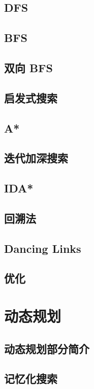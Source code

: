 \section{DFS}

\section{BFS}

\section{双向 BFS}

\section{启发式搜索}

\section{A*}

\section{迭代加深搜索}

\section{IDA*}

\section{回溯法}

\section{Dancing Links}

\section{优化}

\chapter{动态规划}
\section{动态规划部分简介}

\section{记忆化搜索}


